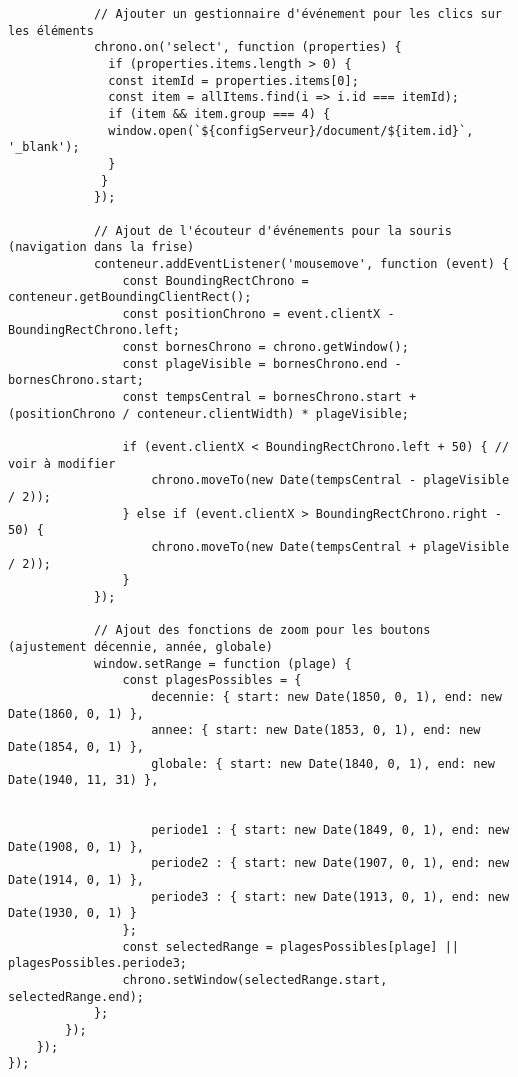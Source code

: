 \begin{verbatim}
            // Ajouter un gestionnaire d'événement pour les clics sur les éléments
            chrono.on('select', function (properties) {
              if (properties.items.length > 0) {
              const itemId = properties.items[0];
              const item = allItems.find(i => i.id === itemId);
              if (item && item.group === 4) { 
              window.open(`${configServeur}/document/${item.id}`, '_blank');
              }
             }
            });

            // Ajout de l'écouteur d'événements pour la souris (navigation dans la frise)
            conteneur.addEventListener('mousemove', function (event) {
                const BoundingRectChrono = conteneur.getBoundingClientRect();
                const positionChrono = event.clientX - BoundingRectChrono.left;
                const bornesChrono = chrono.getWindow();
                const plageVisible = bornesChrono.end - bornesChrono.start;
                const tempsCentral = bornesChrono.start + (positionChrono / conteneur.clientWidth) * plageVisible;

                if (event.clientX < BoundingRectChrono.left + 50) { // voir à modifier
                    chrono.moveTo(new Date(tempsCentral - plageVisible / 2));
                } else if (event.clientX > BoundingRectChrono.right - 50) {
                    chrono.moveTo(new Date(tempsCentral + plageVisible / 2));
                }
            });

            // Ajout des fonctions de zoom pour les boutons (ajustement décennie, année, globale)
            window.setRange = function (plage) {
                const plagesPossibles = {
                    decennie: { start: new Date(1850, 0, 1), end: new Date(1860, 0, 1) },
                    annee: { start: new Date(1853, 0, 1), end: new Date(1854, 0, 1) },
                    globale: { start: new Date(1840, 0, 1), end: new Date(1940, 11, 31) },
                    
                    
                    periode1 : { start: new Date(1849, 0, 1), end: new Date(1908, 0, 1) },
                    periode2 : { start: new Date(1907, 0, 1), end: new Date(1914, 0, 1) },
                    periode3 : { start: new Date(1913, 0, 1), end: new Date(1930, 0, 1) }
                };
                const selectedRange = plagesPossibles[plage] || plagesPossibles.periode3;
                chrono.setWindow(selectedRange.start, selectedRange.end);
            };
        });
    });
});
\end{verbatim}